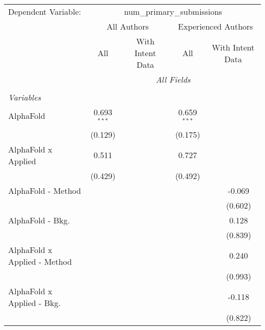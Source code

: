 \begingroup
\centering
\begin{tabular}{lcccccc}
   \tabularnewline \midrule \midrule
   Dependent Variable: & \multicolumn{6}{c}{num\_primary\_submissions}\\
 & \multicolumn{3}{c}{All Authors} & \multicolumn{3}{c}{Experienced Authors} \\
\cmidrule(lr){2-4} \cmidrule(lr){5-7}
 & \multicolumn{1}{c}{All} & \multicolumn{2}{c}{With Intent Data} & \multicolumn{1}{c}{All} & \multicolumn{2}{c}{With Intent Data} \\
\cmidrule(lr){2-2} \cmidrule(lr){3-4} \cmidrule(lr){5-5} \cmidrule(lr){6-7}
 & \multicolumn{6}{c}{\textit{All Fields}} \\ \\
   \emph{Variables}\\
   AlphaFold                      & 0.693$^{***}$ &         &         & 0.659$^{***}$ &        &   \\   
                                  & (0.129)       &         &         & (0.175)       &        &   \\   
   AlphaFold x Applied            & 0.511         &         &         & 0.727         &        &   \\   
                                  & (0.429)       &         &         & (0.492)       &        &   \\   
   AlphaFold - Method             &               &         &         &               &        & -0.069\\   
                                  &               &         &         &               &        & (0.602)\\   
   AlphaFold - Bkg.               &               &         &         &               &        & 0.128\\   
                                  &               &         &         &               &        & (0.839)\\   
   AlphaFold x Applied - Method   &               &         &         &               &        & 0.240\\   
                                  &               &         &         &               &        & (0.993)\\   
   AlphaFold x Applied - Bkg.     &               &         &         &               &        & -0.118\\   
                                  &               &         &         &               &        & (0.822)\\   

\end{tabular}
